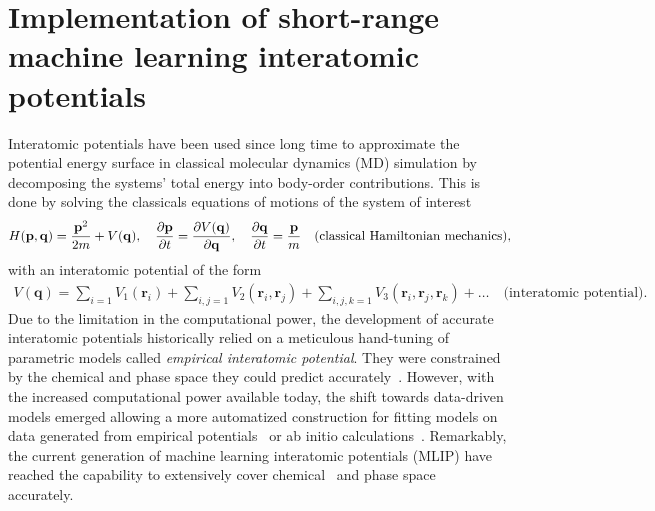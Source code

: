 \chapter{Implementation of short-range machine learning interatomic potentials}

Interatomic potentials have been used since long time to approximate the potential energy surface in classical molecular dynamics (MD) simulation by decomposing the systems' total energy into body-order contributions.
This is done by solving the classicals equations of motions of the system of interest
\begin{subequations}
\begin{align}
  H(\mathbf{p}, \mathbf{q}) = \frac{\mathbf{p}^2}{2m} + V(\mathbf{q}),\quad
  \frac{\partial\mathbf{p}}{\partial t} = \frac{\partial V(\mathbf{q})}{\partial\mathbf{q}},\quad\frac{\partial\mathbf{q}}{\partial t} = \frac{\mathbf{p}}{m}\quad\textrm{(classical Hamiltonian mechanics)},
\end{align}\\
\end{subequations}
with an interatomic potential of the form
\begin{subequations}
\begin{gather}
  V(\mathbf{q}) = \sum_{i = 1} V_1(\mathbf{r}_i) + \sum_{i,j = 1} V_2(\mathbf{r}_i, \mathbf{r}_j) + \sum_{i,j,k = 1} V_3(\mathbf{r}_i, \mathbf{r}_j, \mathbf{r}_k) + \ldots \quad\textrm{(interatomic potential)}.
\end{gather}
\end{subequations}
Due to the limitation in the computational power, the development of accurate interatomic potentials historically relied on a meticulous hand-tuning of parametric models called \emph{empirical interatomic potential}.
They were constrained by the chemical and phase space they could predict accurately~\cite{stillinger1985computer, tersoff1988empirical}.
However, with the increased computational power available today, the shift towards data-driven models emerged allowing a more automatized construction for fitting models on data generated from empirical potentials~\cite{blank1995neural} or ab initio calculations~\cite{brown2003classical,lorenz2006descriptions,behl-parr07prl}.
Remarkably, the current generation of machine learning interatomic potentials (MLIP) have reached the capability to extensively cover chemical~\cite{lopanitsyna2023modeling} and phase space~\cite{bartok2018machine} accurately.

